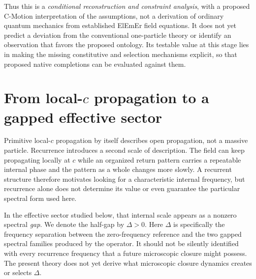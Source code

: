\documentclass[11pt]{article}
\theoremstyle{definition}
\begin{document}
Thus this is a \emph{conditional reconstruction and constraint analysis}, with
a proposed C-Motion interpretation of the assumptions, not a derivation of
ordinary quantum mechanics from established ElEmEr field equations.  It does
not yet predict a deviation from the conventional one-particle theory or
identify an observation that favors the proposed ontology.  Its testable
value at this stage lies in making the missing constitutive and selection
mechanisms explicit, so that proposed native completions can be evaluated
against them.

\section{From local-\texorpdfstring{$c$}{c} propagation to a gapped effective sector}
\label{sec:antecedents}

Primitive local-$c$ propagation by itself describes open propagation, not a massive particle.
Recurrence introduces a second scale of description.  The field can keep propagating locally at
$c$ while an organized return pattern carries a repeatable internal phase and the pattern as a
whole changes more slowly.  A recurrent structure therefore motivates looking for a
characteristic internal frequency, but recurrence alone does not determine its value or even
guarantee the particular spectral form used here.

In the effective sector studied below, that internal scale appears as a nonzero spectral
\emph{gap}.  We denote the half-gap by $\Delta>0$.  Here $\Delta$ is specifically the frequency
separation between the zero-frequency reference and the two gapped spectral families produced
by the operator.  It should not be silently identified with every recurrence frequency that a
future microscopic closure might possess.  The present theory does not yet derive what
microscopic closure dynamics creates or selects $\Delta$.
\end{document}
